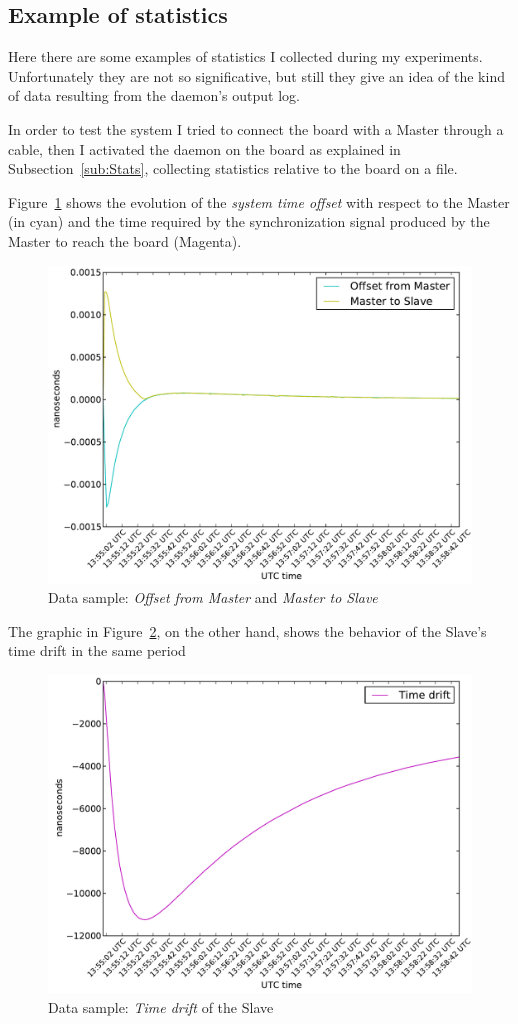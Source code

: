 \subsection{ Example of statistics }

    Here there are some examples of statistics I collected during my
    experiments. Unfortunately they are not so significative, but still
    they give an idea of the kind of data resulting from the daemon's
    output log.

    In order to test the system I tried to connect the board with a Master
    through a  cable, then I activated the daemon on the
    board as explained in Subsection~\ref{sub:Stats}, collecting
    statistics relative to the board on a file.

    Figure~\ref{img:OFM-MTS} shows the evolution of the \emph{system time
    offset} with respect to the Master (in cyan) and the time required by
    the synchronization signal produced by the Master to reach the board
    (Magenta).
    \begin{figure}[hb]
        \centering
        \includegraphics[width=.8\textwidth]{pics/figure01}
        \caption{Data sample: \emph{Offset from Master} and \emph{Master to
                 Slave}}
        \label{img:OFM-MTS}
    \end{figure}

    The graphic in Figure~\ref{img:TimeDrift}, on the other hand, shows
    the behavior of the Slave's time drift in the same period
    \begin{figure}[hb]
        \centering
        \includegraphics[width=.8\textwidth]{pics/figure02}
        \caption{Data sample: \emph{Time drift} of the Slave}
        \label{img:TimeDrift}
    \end{figure}

